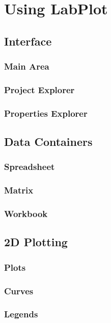 \part{Using LabPlot}

\chapter{Interface}
\section{Main Area}
\section{Project Explorer}
\section{Properties Explorer}

\chapter{Data Containers}
\section{Spreadsheet}
\section{Matrix}
\section{Workbook}

\chapter{2D Plotting}
\section{Plots}
\section{Curves}
\section{Legends}



